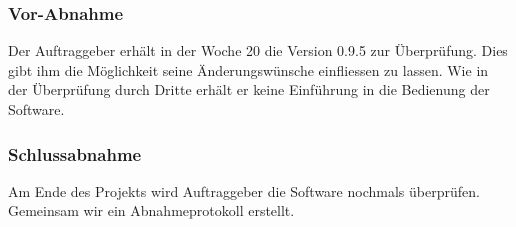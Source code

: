 \subsubsection{Vor-Abnahme} \label{subsubsec:1}

Der Auftraggeber erhält in der Woche 20 die Version 0.9.5 zur Überprüfung. Dies gibt ihm die Möglichkeit seine Änderungswünsche einfliessen zu lassen. Wie in der Überprüfung durch Dritte erhält er keine Einführung in die Bedienung der Software.

\subsubsection{Schlussabnahme} \label{subsubsec:2}

Am Ende des Projekts wird Auftraggeber die Software nochmals überprüfen. Gemeinsam wir ein Abnahmeprotokoll erstellt.